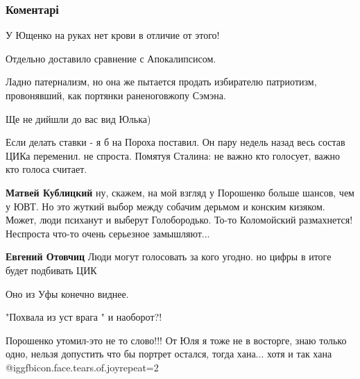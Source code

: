  
 
 
 
 
\subsubsection{Коментарі}

\begin{itemize} %
У Ющенко на руках нет крови в отличие от этого!

Отдельно доставило сравнение с Апокалипсисом.

Ладно патернализм, но она же пытается продать избирателю патриотизм, провонявший, как портянки раненоговжопу Сэмэна.

Ще не дийшли до вас вид Юлька)


Если делать ставки - я б на Пороха поставил. Он пару недель назад весь состав
ЦИКа переменил. не спроста. Помятуя Сталина: не важно кто голосует, важно кто
голоса считает.

\begin{itemize} %
\textbf{Матвей Кублицкий} ну, скажем, на мой взгляд у Порошенко больше шансов, чем у ЮВТ. Но это жуткий выбор между собачим дерьмом и конским кизяком.
Может, люди психанут и выберут Голобородько. То-то Коломойский размахнется! Неспроста что-то очень серьезное замышляют...

\textbf{Евгений Отовчиц} Люди могут голосовать за кого угодно. но цифры в итоге будет подбивать ЦИК

Оно из Уфы конечно виднее.
\end{itemize} %

"Похвала из уст врага " и наоборот?!


Порошенко утомил-это не то слово!!! От Юля я тоже не в восторге, знаю только
одно, нельзя допустить что бы портрет остался, тогда хана... хотя и так хана @igg{fbicon.face.tears.of.joy}{repeat=2} 


\end{itemize}
